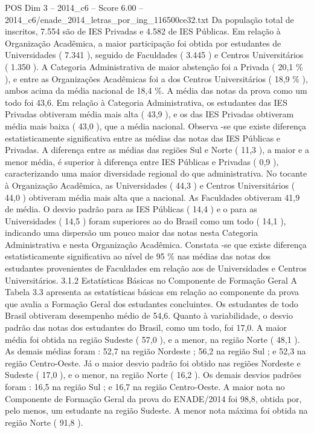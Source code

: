 \begin{textsample}{POS Dim 3 – 2014\_c6 – Score 6.00 – 2014\_c6/enade\_2014\_letras\_por\_ing\_116500ce32.txt}
Da população total de inscritos, 7.554 são de IES Privadas e 4.582 de IES Públicas.
Em relação à Organização Acadêmica, a maior participação foi obtida por estudantes de Universidades ( 7.341 ), seguido de Faculdades ( 3.445 ) e Centros Universitários ( 1.350 ).
A Categoria Administrativa de maior abstenção foi a Privada ( 20,1 \% ), e entre as Organizações Acadêmicas foi a dos Centros Universitários ( 18,9 \% ), ambos acima da média nacional de 18,4 \%.
A média das notas da prova como um todo foi 43,6.
Em relação à Categoria Administrativa, os estudantes das IES Privadas obtiveram média mais alta ( 43,9 ), e os das IES Privadas obtiveram média mais baixa ( 43,0 ), que a média nacional.
Observa -se que existe diferença estatisticamente significativa entre as médias das notas das IES Públicas e Privadas.
A diferença entre as médias das regiões Sul e Norte ( 11,3 ), a maior e a menor média, é superior à diferença entre IES Públicas e Privadas ( 0,9 ), caracterizando uma maior diversidade regional do que administrativa.
No tocante à Organização Acadêmica, as Universidades ( 44,3 ) e Centros Universitários ( 44,0 ) obtiveram média mais alta que a nacional.
As Faculdades obtiveram 41,9 de média.
O desvio padrão para as IES Públicas ( 14,4 ) e o para as Universidades ( 14,5 ) foram superiores ao do Brasil como um todo ( 14,1 ), indicando uma dispersão um pouco maior das notas nesta Categoria Administrativa e nesta Organização Acadêmica.
Constata -se que existe diferença estatisticamente significativa ao nível de 95 \% nas médias das notas dos estudantes provenientes de Faculdades em relação aos de Universidades e Centros Universitários. 3.1.2 Estatísticas Básicas no Componente de Formação Geral A Tabela 3.3 apresenta as estatísticas básicas em relação ao componente da prova que avalia a Formação Geral dos estudantes concluintes.
Os estudantes de todo Brasil obtiveram desempenho médio de 54,6.
Quanto à variabilidade, o desvio padrão das notas dos estudantes do Brasil, como um todo, foi 17,0.
A maior média foi obtida na região Sudeste ( 57,0 ), e a menor, na região Norte ( 48,1 ).
As demais médias foram : 52,7 na região Nordeste ; 56,2 na região Sul ; e 52,3 na região Centro-Oeste.
Já o maior desvio padrão foi obtido nas regiões Nordeste e Sudeste ( 17,0 ), e o menor, na região Norte ( 16,2 ).
Os demais desvios padrões foram : 16,5 na região Sul ; e 16,7 na região Centro-Oeste.
A maior nota no Componente de Formação Geral da prova do ENADE/2014 foi 98,8, obtida por, pelo menos, um estudante na região Sudeste.
A menor nota máxima foi obtida na região Norte ( 91,8 ).

\end{textsample}
